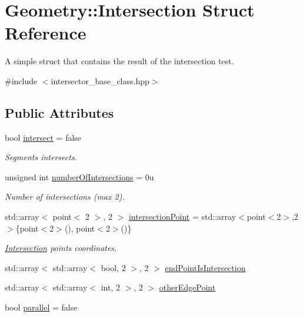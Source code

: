 \hypertarget{structGeometry_1_1Intersection}{
\section{Geometry::Intersection Struct Reference}
\label{structGeometry_1_1Intersection}
}


A simple struct that contains the result of the intersection test.  


{\ttfamily \#include $<$intersector\_\-base\_\-class.hpp$>$}\subsection*{Public Attributes}
\begin{DoxyCompactItemize}
\item 
bool \hyperlink{structGeometry_1_1Intersection_a45563c77f618ad3a58931ed051032d45}{intersect} = false
\begin{DoxyCompactList}\small\item\em Segments intersects. \item\end{DoxyCompactList}\item 
\hypertarget{structGeometry_1_1Intersection_a30339c7930808caca3df89da3df2b034}{
unsigned int \hyperlink{structGeometry_1_1Intersection_a30339c7930808caca3df89da3df2b034}{numberOfIntersections} = 0u}
\label{structGeometry_1_1Intersection_a30339c7930808caca3df89da3df2b034}

\begin{DoxyCompactList}\small\item\em Number of intersections (max 2). \item\end{DoxyCompactList}\item 
\hypertarget{structGeometry_1_1Intersection_abd19dce0869cb0e34ce94f48138b8f38}{
std::array$<$ point$<$ 2 $>$, 2 $>$ \hyperlink{structGeometry_1_1Intersection_abd19dce0869cb0e34ce94f48138b8f38}{intersectionPoint} = std::array$<$point$<$2$>$,2$>$\{point$<$2$>$(), point$<$2$>$()\}}
\label{structGeometry_1_1Intersection_abd19dce0869cb0e34ce94f48138b8f38}

\begin{DoxyCompactList}\small\item\em \hyperlink{structGeometry_1_1Intersection}{Intersection} points coordinates. \item\end{DoxyCompactList}\item 
std::array$<$ std::array$<$ bool, 2 $>$, 2 $>$ \hyperlink{structGeometry_1_1Intersection_ac26994bdf89460be8b13c1304796b6bb}{endPointIsIntersection}
\item 
std::array$<$ std::array$<$ int, 2 $>$, 2 $>$ \hyperlink{structGeometry_1_1Intersection_a15cd54d14fc1ddc1f4499dc49e1d5508}{otherEdgePoint}
\item 
\hypertarget{structGeometry_1_1Intersection_aad30a67c865aca570fff7f29a9251903}{
bool \hyperlink{structGeometry_1_1Intersection_aad30a67c865aca570fff7f29a9251903}{parallel} = false}
\label{structGeometry_1_1Intersection_aad30a67c865aca570fff7f29a9251903}


\end{DoxyCompactItemize}
